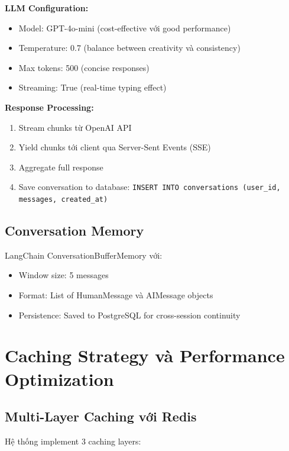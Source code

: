 \begin{itemize}
\textbf{LLM Configuration:}
\begin{itemize}
    \item Model: GPT-4o-mini (cost-effective với good performance)
    \item Temperature: 0.7 (balance between creativity và consistency)
    \item Max tokens: 500 (concise responses)
    \item Streaming: True (real-time typing effect)
\end{itemize}

\textbf{Response Processing:}
\begin{enumerate}
    \item Stream chunks từ OpenAI API
    \item Yield chunks tới client qua Server-Sent Events (SSE)
    \item Aggregate full response
    \item Save conversation to database: \texttt{INSERT INTO conversations (user\_id, messages, created\_at)}
\end{enumerate}

\subsection{Conversation Memory}

LangChain ConversationBufferMemory với:
\begin{itemize}
    \item Window size: 5 messages
    \item Format: List of HumanMessage và AIMessage objects
    \item Persistence: Saved to PostgreSQL for cross-session continuity
\end{itemize}

\section{Caching Strategy và Performance Optimization}

\subsection{Multi-Layer Caching với Redis}

Hệ thống implement 3 caching layers:


\end{itemize}
